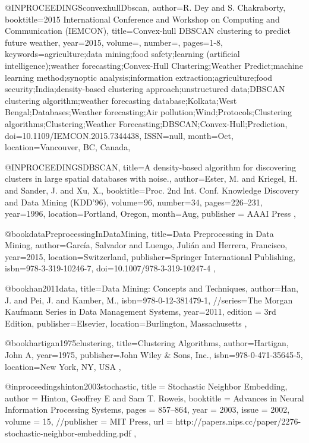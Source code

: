 @INPROCEEDINGS{convexhullDbscan, 
author={R. {Dey} and S. {Chakraborty}}, 
booktitle={2015 International Conference and Workshop on Computing and Communication (IEMCON)}, 
title={Convex-hull DBSCAN clustering to predict future weather}, 
year={2015}, 
volume={}, 
number={}, 
pages={1-8}, 
keywords={agriculture;data mining;food safety;learning (artificial intelligence);weather forecasting;Convex-Hull Clustering;Weather Predict;machine learning method;synoptic analysis;information extraction;agriculture;food security;India;density-based clustering approach;unstructured data;DBSCAN clustering algorithm;weather forecasting database;Kolkata;West Bengal;Databases;Weather forecasting;Air pollution;Wind;Protocols;Clustering algorithms;Clustering;Weather Forecasting;DBSCAN;Convex-Hull;Prediction}, 
doi={10.1109/IEMCON.2015.7344438}, 
ISSN={null}, 
month={Oct},
location={Vancouver, BC, Canada}},


@INPROCEEDINGS{DBSCAN,
  title={A density-based algorithm for discovering clusters in large spatial databases with noise.},
  author={Ester, M. and Kriegel, H. and Sander, J. and Xu, X.},
  booktitle={Proc. 2nd Int. Conf. Knowledge Discovery and Data Mining (KDD’96)},
  volume={96},
  number={34},
  pages={226--231},
  year={1996},
  location={Portland, Oregon},
  month={Aug},
  publisher = {AAAI Press}
},


@book{dataPreprocessingInDataMining,
  title={Data Preprocessing in Data Mining},
  author={García, Salvador and Luengo, Julián and Herrera, Francisco},
  year={2015},
  location={Switzerland},
  publisher={Springer International Publishing},
  isbn={978-3-319-10246-7},
  doi={10.1007/978-3-319-10247-4}
},

@book{han2011data,
  title={Data Mining: Concepts and Techniques},
  author={Han, J. and Pei, J. and Kamber, M.},
  isbn={978-0-12-381479-1},
  //series={The Morgan Kaufmann Series in Data Management Systems},
  year={2011},
  edition = {3rd Edition},
  publisher={Elsevier},
  location={Burlington, Massachusetts}
},

@book{hartigan1975clustering,
  title={Clustering Algorithms},
  author={Hartigan, John A},
  year={1975},
  publisher={John Wiley \& Sons, Inc.},
  isbn={978-0-471-35645-5},
  location={New York, NY, USA}
},

@inproceedings{hinton2003stochastic,
  title = {Stochastic Neighbor Embedding},
  author = {Hinton, Geoffrey E and Sam T. Roweis},
  booktitle = {Advances in Neural Information Processing Systems},
  pages = {857--864},
  year = {2003},
  issue = {2002},
  volume = {15},
  //publisher = {MIT Press},
  url = {http://papers.nips.cc/paper/2276-stochastic-neighbor-embedding.pdf}
},

